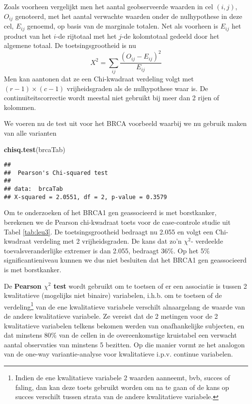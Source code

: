 \documentclass[
  12pt,dutch,coursenotes]{book}
\newenvironment{Shaded}{\begin{snugshade}}{\end{snugshade}}
\newcommand{\KeywordTok}[1]{\textcolor[rgb]{0.13,0.29,0.53}{\textbf{#1}}}
\newcommand{\NormalTok}[1]{#1}
\theoremstyle{definition}
\theoremstyle{definition}
\theoremstyle{definition}
\theoremstyle{remark}
\begin{document}
Zoals voorheen vergelijkt men het aantal geobserveerde waarden in cel \((i,j)\), \(O_{ij}\) genoteerd, met het aantal verwachte waarden onder de nulhypothese
in deze cel, \(E_{ij}\) genoemd, op basis van de marginale totalen. Net als
voorheen is \(E_{ij}\) het product van het \(i\)-de rijtotaal met het \(j\)-de
kolomtotaal gedeeld door het algemene totaal. De toetsingsgrootheid is nu
\begin{equation*}
X^2 = \sum_{ij} \frac{\left (O_{ij} - E_{ij}\right)^2 }{ E_{ij}}
\end{equation*}
Men kan aantonen dat ze een Chi-kwadraat verdeling volgt met \((r-1) \times (c-1)\) vrijheidsgraden als de nulhypothese waar is. De continuïteitscorrectie wordt meestal niet gebruikt bij meer dan 2 rijen of
kolommen.

We voeren nu de test uit voor het BRCA voorbeeld waarbij we nu gebruik maken van alle varianten

\begin{Shaded}
\begin{Highlighting}[]
\KeywordTok{chisq.test}\NormalTok{(brcaTab)}
\end{Highlighting}
\end{Shaded}

\begin{verbatim}
## 
##  Pearson's Chi-squared test
## 
## data:  brcaTab
## X-squared = 2.0551, df = 2, p-value = 0.3579
\end{verbatim}

Om te onderzoeken of het BRCA1 gen geassocieerd is met borstkanker, berekenen we de Pearson chi-kwadraat toets voor de case-controle studie uit Tabel \ref{tab:leu3}. De toetsingsgrootheid bedraagt nu 2.055 en volgt een Chi-kwadraat verdeling met 2 vrijheidsgraden. De kans dat zo'n \(\chi^2\)- verdeelde toevalsveranderlijke extremer is dan 2.055, bedraagt 36\%.
Op het 5\% significantieniveau kunnen we dus niet besluiten dat het BRCA1 gen geassocieerd is met borstkanker.

De \textbf{Pearson \(\chi^2\) test} wordt gebruikt om te toetsen of er een associatie is tussen 2 kwalitatieve (mogelijks niet binaire) variabelen, i.h.b. om te toetsen of de verdeling\footnote{Indien de ene kwalitatieve variabele 2 waarden aanneemt, bvb, succes of faling, dan kan deze toets gebruikt worden om na te gaan of de kans op succes verschilt tussen strata van de andere kwalitatieve variabele.} van de ene kwalitatieve variabele verschilt alnaargelang de waarde van de andere kwalitatieve variabele. Ze vereist dat de 2 metingen voor de 2 kwalitatieve variabelen telkens bekomen werden van onafhankelijke subjecten, en dat minstens 80\% van de cellen in de overeenkomstige kruistabel een verwacht aantal observaties van minstens 5 bezitten. Op die manier vormt ze het analogon van de one-way variantie-analyse voor kwalitatieve i.p.v. continue variabelen.
\end{document}
